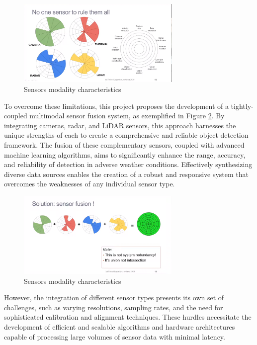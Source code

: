 \documentclass[report.tex]{subfiles}
\begin{document}
        \begin{figure}[h]
            \centering
            \includegraphics[width=0.7\textwidth]{images/sensors_intro_1.png}
            \caption{Sensors modality characteristics \cite{Sensor_modality_characteristics_1}}
            \label{fig:sensors_intro_1}
        \end{figure}

        To overcome these limitations, this project proposes the development of a tightly-coupled multimodal sensor fusion system, as exemplified in Figure \ref{fig:sensors_intro_2}. By integrating cameras, radar, and LiDAR sensors, this approach harnesses the unique strengths of each to create a comprehensive and reliable object detection framework. The fusion of these complementary sensors, coupled with advanced machine learning algorithms, aims to significantly enhance the range, accuracy, and reliability of detection in adverse weather conditions. Effectively synthesizing diverse data sources enables the creation of a robust and responsive system that overcomes the weaknesses of any individual sensor type.

        \begin{figure}[h]
            \centering
            \includegraphics[width=0.7\textwidth]{images/sensors_intro_2.png}
            \caption{Sensors modality characteristics \cite{Sensor_modality_characteristics_1}}
            \label{fig:sensors_intro_2}
        \end{figure}

        However, the integration of different sensor types presents its own set of challenges, such as varying resolutions, sampling rates, and the need for sophisticated calibration and alignment techniques. These hurdles necessitate the development of efficient and scalable algorithms and hardware architectures capable of processing large volumes of sensor data with minimal latency.
\end{document}
